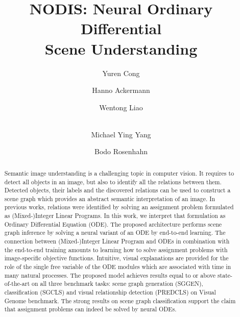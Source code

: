\documentclass[runningheads]{llncs}
\begin{document}
\pagestyle{headings}
\mainmatter


\title{NODIS: Neural Ordinary Differential \\ Scene Understanding} 

\begin{comment}
\titlerunning{NODIS} 
\authorrunning{Cong et al.} 
\author{Yuren Cong^1, Hanno Ackermann, Wentong Liao, Michael Ying Yang, Bodo Rosenhahn}
\institute{Leibniz University Hannover, Germany,
University of Twente, The Netherlands}
\end{comment}


\author{Yuren Cong \and Hanno Ackermann \and Wentong Liao \and \\
Michael Ying Yang \and Bodo Rosenhahn}
\maketitle







\begin{abstract}
    Semantic image understanding is a challenging topic in computer vision. It requires to detect all objects in an image, but also to identify all the relations between them. Detected objects, their labels and the discovered relations can be used to construct a scene graph which provides an abstract semantic interpretation of an image. In previous works, relations were identified by solving an assignment problem formulated as (Mixed-)Integer Linear Programs. 
    In this work, we interpret that formulation as Ordinary Differential Equation (ODE).  The proposed architecture performs scene graph inference by solving a neural variant of an ODE by end-to-end learning. The connection between (Mixed-)Integer Linear Program and ODEs in combination with the end-to-end training amounts to learning how to solve assignment problems with image-specific objective functions. Intuitive, visual explanations are provided for the role of the single free variable of the ODE modules which are associated with time in many natural processes. 
    The proposed model achieves results equal to or above state-of-the-art on all three benchmark tasks: scene graph generation (SGGEN), classification (SGCLS) and visual relationship detection (PREDCLS) on Visual Genome benchmark. The strong results on scene graph classification support the claim that assignment problems can indeed be solved by neural ODEs.
\end{abstract}
\end{document}
